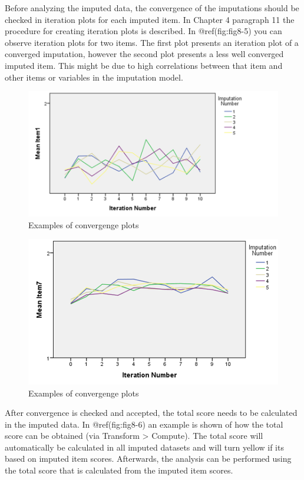 \documentclass[
]{book}
\begin{document}
Before analyzing the imputed data, the convergence of the imputations
should be checked in iteration plots for each imputed item. In Chapter 4
paragraph 11 the procedure for creating iteration plots is described. In
@ref(fig:fig8-5) you can observe iteration plots for two items. The
first plot presents an iteration plot of a converged imputation, however
the second plot presents a less well converged imputed item. This might
be due to high correlations between that item and other items or
variables in the imputation model.

\begin{figure}

{\centering \includegraphics[width=0.9\linewidth]{images/fig8.5a} 

}

\caption{Examples of convergenge plots}\label{fig:fig8-51}
\end{figure}
\begin{figure}

{\centering \includegraphics[width=0.9\linewidth]{images/fig8.5b} 

}

\caption{Examples of convergenge plots}\label{fig:fig8-52}
\end{figure}

After convergence is checked and accepted, the total score needs to be
calculated in the imputed data. In @ref(fig:fig8-6) an example is shown
of how the total score can be obtained (via Transform \textgreater{}
Compute). The total score will automatically be calculated in all
imputed datasets and will turn yellow if its based on imputed item
scores. Afterwards, the analysis can be performed using the total score
that is calculated from the imputed item scores.
\end{document}
